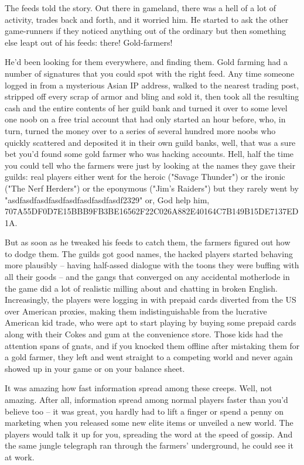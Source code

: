 The feeds told the story. Out there in gameland, there was a hell
of a lot of activity, trades back and forth, and it worried him. He
started to ask the other game-runners if they noticed anything out
of the ordinary but then something else leapt out of his feeds:
there! Gold-farmers!

He'd been looking for them everywhere, and finding them. Gold
farming had a number of signatures that you could spot with the
right feed. Any time someone logged in from a mysterious Asian IP
address, walked to the nearest trading post, stripped off every
scrap of armor and bling and sold it, then took all the resulting
cash and the entire contents of her guild bank and turned it over
to some level one noob on a free trial account that had only
started an hour before, who, in turn, turned the money over to a
series of several hundred more noobs who quickly scattered and
deposited it in their own guild banks, well, that was a sure bet
you'd found some gold farmer who was hacking accounts. Hell, half
the time you could tell who the farmers were just by looking at the
names they gave their guilds: real players either went for the
heroic ("Savage Thunder") or the ironic ("The Nerf Herders") or the
eponymous ("Jim's Raiders") but they rarely went by
"asdfasdfasdfasdfasdfasdfasdfasdf2329" or, God help him,
707A55DF0D7E15BBB9FB3BE16562F22C026A882E40164C7B149B15DE7137ED1A.

But as soon as he tweaked his feeds to catch them, the farmers
figured out how to dodge them. The guilds got good names, the
hacked players started behaving more plausibly -- having half-assed
dialogue with the toons they were buffing with all their goods --
and the gangs that converged on any accidental motherlode in the
game did a lot of realistic milling about and chatting in broken
English. Increasingly, the players were logging in with prepaid
cards diverted from the US over American proxies, making them
indistinguishable from the lucrative American kid trade, who were
apt to start playing by buying some prepaid cards along with their
Cokes and gum at the convenience store. Those kids had the
attention spans of gnats, and if you knocked them offline after
mistaking them for a gold farmer, they left and went straight to a
competing world and never again showed up in your game or on your
balance sheet.

It was amazing how fast information spread among these creeps.
Well, not amazing. After all, information spread among normal
players faster than you'd believe too -- it was great, you hardly
had to lift a finger or spend a penny on marketing when you
released some new elite items or unveiled a new world. The players
would talk it up for you, spreading the word at the speed of
gossip. And the same jungle telegraph ran through the farmers'
underground, he could see it at work.

